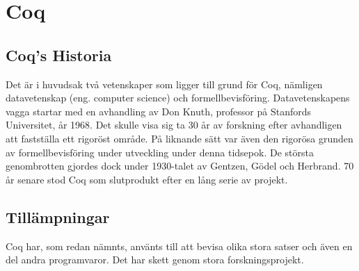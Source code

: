 \section{Coq}

\subsection{Coq's Historia}
Det är i huvudsak två vetenskaper som ligger till grund för Coq, nämligen
datavetenskap (eng. computer science) och formellbevisföring. Datavetenskapens
vagga startar med en avhandling av Don Knuth, professor på Stanfords
Universitet, år 1968. Det skulle visa sig ta 30 år av forskning efter
avhandligen att fastställa ett rigoröst område. På liknande sätt var även den
rigorösa grunden av formellbevisföring under utveckling under denna tidsepok.
De största genombrotten gjordes dock under 1930-talet av Gentzen, Gödel och
Herbrand. 70 år senare stod Coq som slutprodukt efter en lång serie av projekt.

\subsection{Tillämpningar}
Coq har, som redan nämnts, använts till att bevisa olika stora satser och även
en del andra programvaror. Det har skett genom stora forskningsprojekt.

